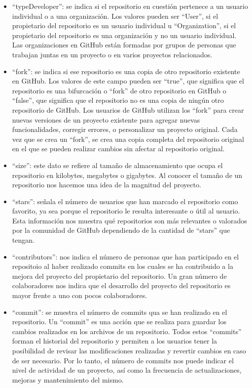 \documentclass[a4paper, 12pt]{book}
\begin{document}
\begin{itemize}
  \item ``typeDeveloper'': se indica si el repositorio en cuestión pertenece a un usuario individual o a una organización. 
  Los valores pueden ser ``User'', si el propietario del repositorio es un usuario individual u ``Organization'', si el propietario del repositorio es una organización y no un usuario individual. 
  Las organizaciones en GitHub están formadas por grupos de personas que trabajan juntas en un proyecto o en varios proyectos relacionados.
  
  \item ``fork'': se indica si ese repositorio es una copia de otro repositorio existente en GitHub. 
  Los valores de este campo pueden ser ``true'', que significa que el repositorio es una bifurcación o ``fork'' de otro repositorio en GitHub o ``false'', que significa que el repositorio no es una copia de ningún otro repositorio de GitHub.
  Los usuarios de GitHub utilizan los ``fork'' para crear nuevas versiones de un proyecto existente para agregar nuevas funcionalidades, corregir errores, o personalizar un proyecto original.
  Cada vez que se crea un ``fork'', se crea una copia completa del repositorio original en el que se pueden realizar cambios sin afectar al repositorio original.
  
  \item ``size'': este dato se refiere al tamaño de almacenamiento que ocupa el repositorio en kilobytes, megabytes o gigabytes.  
  Al conocer el tamaño de un repositorio nos hacemos una idea de la magnitud del proyecto.

  \item ``stars'': señala el número de usuarios que han marcado el repositorio como favorito, ya sea porque el repositorio le resulta interesante o útil al usuario.
  Esta información nos muestra qué repositorios son más relevantes o valorados por la comunidad de GitHub dependiendo de la cantidad de ``stars'' que tengan.

  \item ``contributors'': nos indica el número de personas que han participado en el repositoio al haber realizado commits en los cuales se ha contribuido a la mejora del proyecto del propietario del repositorio.
  Un gran número de colaboradores nos indica que el desarrollo del proyecto del repositorio es mayor frente a uno con pocos colaboradores.
  
  \item ``commit'': se muestra el número de commits qua se han realizado en el repositorio.
  Un ``commit'' es una acción que se realiza para guardar los cambios realizados en los archivos de un repositorio.
  Todos estos ``commits'' forman el historial del repositorio y permiten a los usuarios tener la posibilidad de revisar las modificaciones realizadas y revertir cambios en caso de ser necesario. 
  Por lo tanto, el número de commits nos puede indicar el nivel de actividad de un proyecto, así como la frecuencia de actualizaciones, mejoras y mantenimiento del mismo.
 
\end{itemize} 
\end{document}
